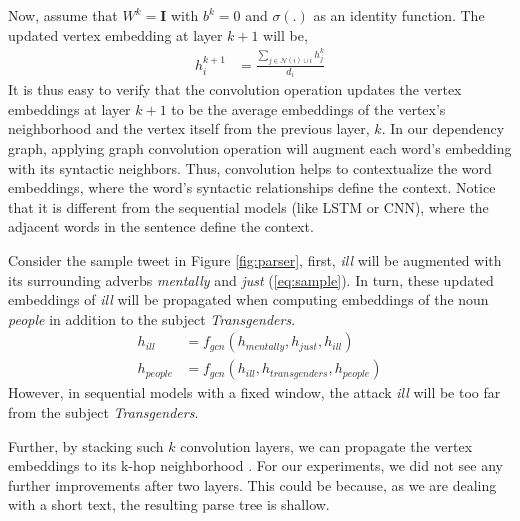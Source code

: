 Now, assume that $W^k = \mathbf{{I}}$ with $b^k = 0$ and $\sigma(.)$ as an identity function. The updated vertex embedding at layer $k+1$ will be,
\begin{align}
    h_i^{k+1} &= \frac{ \sum\limits_{j \in \mathcal{N}(i) \cup i} h_j^k} {d_i}
\end{align}
It is thus easy to verify that the convolution operation updates the vertex embeddings at layer $k+1$ to be the average embeddings of the vertex's neighborhood and the vertex itself from the previous layer, $k$. In our dependency graph, applying graph convolution operation will augment each word's embedding with its syntactic neighbors.
Thus, convolution helps to contextualize the word embeddings, where the word's syntactic relationships define the context. Notice that it is different from the sequential models (like LSTM or CNN), where the adjacent words in the sentence define the context.

Consider the sample tweet in Figure \ref{fig:parser}, first, \textit{ill} will be augmented with its surrounding adverbs \textit{mentally} and \textit{just} (\cref{eq:sample}). In turn, these updated embeddings of \textit{ill} will be propagated when computing embeddings of the noun \textit{people} in addition to the subject \textit{Transgenders}.
\begin{align}
      \label{eq:sample}
      h_{ill} &= f_{gcn}(h_{mentally}, h_{just}, h_{ill}) \\
      h_{people} &= f_{gcn}(h_{ill}, h_{transgenders}, h_{people})
\end{align}
However, in sequential models with a fixed window, the attack \textit{ill} will be too far from the subject \textit{Transgenders}.

Further, by stacking such $k$ convolution layers, we can propagate the vertex embeddings to its k-hop neighborhood \cite{kipf2016semi}. For our experiments, we did not see any further improvements after two layers. This could be because, as we are dealing with a short text, the resulting parse tree is shallow.

